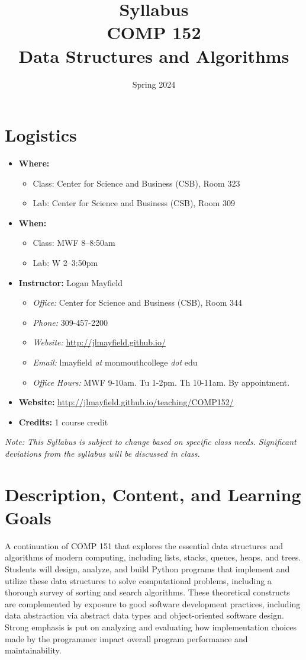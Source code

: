 \documentclass[10pt]{article}
\title{Syllabus \\ COMP 152 \\ Data Structures and Algorithms}
\author{  }
\date{Spring 2024}
\begin{document}
\maketitle

\section{Logistics}
\begin{itemize}
\item \textbf{Where: }
\begin{itemize}
\item Class: Center for Science and Business (CSB), Room 323
\item Lab: Center for Science and Business (CSB), Room 309
\end{itemize}
\item \textbf{When: }
\begin{itemize}
  \item Class: MWF 8--8:50am
  \item Lab: W 2--3:50pm
\end{itemize}
\item \textbf{Instructor: } Logan Mayfield
\begin{itemize}
\item \textit{Office: } Center for Science and Business (CSB), Room 344
\item \textit{Phone: } 309-457-2200 %
\item \textit{Website: } \url{http://jlmayfield.github.io/}
\item \textit{Email: } lmayfield \textit{at} monmouthcollege \textit{dot} edu
\item \textit{Office Hours: }  MWF 9-10am. Tu 1-2pm. Th 10-11am. By appointment.
\end{itemize}
\item \textbf{Website: } \url{http://jlmayfield.github.io/teaching/COMP152/}
\item \textbf{Credits: } 1 course credit
\end{itemize}
\emph{Note: This Syllabus is subject to change based on specific class needs. Significant deviations from the syllabus will be discussed in class.}


\section{Description, Content, and Learning Goals}

A continuation of COMP 151 that explores the essential data structures
and algorithms of modern computing, including lists, stacks, queues,
heaps, and trees. Students will design, analyze, and build Python
programs that implement and utilize these data structures to solve
computational problems, including a thorough survey of sorting and
search algorithms. These theoretical constructs are complemented by
exposure to good software development practices, including data
abstraction via abstract data types and object-oriented software
design. Strong emphasis is put on analyzing and evaluating how
implementation choices made by the programmer impact overall program
performance and maintainability.
\end{document}
